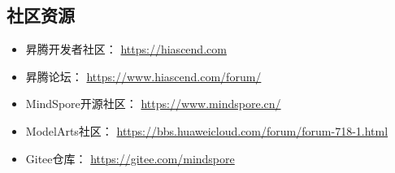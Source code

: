 \subsection{社区资源}
\begin{itemize}
    \item {昇}腾开发者社区： \url{https://hiascend.com}
    \item {昇}腾论坛： \url{https://www.hiascend.com/forum/}
    \item MindSpore开源社区：  \url{https://www.mindspore.cn/}
    \item ModelArts社区：  \url{https://bbs.huaweicloud.com/forum/forum-718-1.html}
    \item Gitee仓库： \url{https://gitee.com/mindspore}
\end{itemize}
